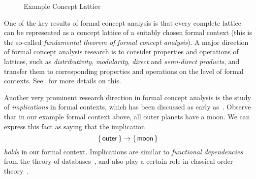 \begin{figure}[tp]
\begin{center}
  \end{center}
  \caption{Example Concept Lattice}
  \label{fig:example-concept-lattice}
\end{figure}

One of the key results of formal concept analysis is that every complete lattice can be
represented as a concept lattice of a suitably chosen formal context (this is the
so-called \emph{fundamental theorem of formal concept analysis}).  A major direction of
formal concept analysis research is to consider properties and operations of lattices,
such as \emph{distributivity}, \emph{modularity}, \emph{direct} and \emph{semi-direct
  products}, and transfer them to corresponding properties and operations on the level of
formal contexts.  See~\cite{fca-book} for more details on this.

Another very prominent research direction in formal concept analysis is the study of
\emph{implications} in formal contexts, which has been discussed as early
as~\cite{fca:Wille:1982}.  Observe that in our example formal context above, all outer
planets have a moon.  We can express this fact as saying that the implication
\begin{equation*}
  {\ensuremath{\{\, \mathsf{outer} \,\}}} \to {\ensuremath{\{\, \mathsf{moon} \,\}}}
\end{equation*}
\emph{holds} in our formal context.  Implications are similar to \emph{functional
  dependencies} from the theory of databases~\cite{DBLP:books/cs/Maier83}, and also play a
certain role in classical order theory~\cite{Wild1994118}.

